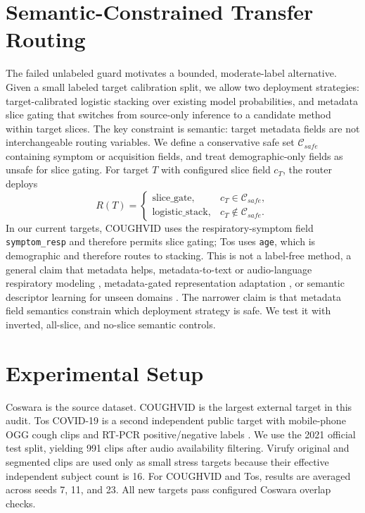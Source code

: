 \documentclass{article}
\begin{document}
\section{Semantic-Constrained Transfer Routing}
The failed unlabeled guard motivates a bounded, moderate-label alternative. Given a small labeled target calibration split, we allow two deployment strategies: target-calibrated logistic stacking over existing model probabilities, and metadata slice gating that switches from source-only inference to a candidate method within target slices. The key constraint is semantic: target metadata fields are not interchangeable routing variables. We define a conservative safe set $\mathcal{C}_{safe}$ containing symptom or acquisition fields, and treat demographic-only fields as unsafe for slice gating. For target $T$ with configured slice field $c_T$, the router deploys
\begin{equation}
R(T)=
\begin{cases}
\mathrm{slice\_gate}, & c_T \in \mathcal{C}_{safe},\\
\mathrm{logistic\_stack}, & c_T \notin \mathcal{C}_{safe}.
\end{cases}
\label{eq:semantic_router}
\end{equation}
In our current targets, COUGHVID uses the respiratory-symptom field \texttt{symptom\_resp} and therefore permits slice gating; Tos uses \texttt{age}, which is demographic and therefore routes to stacking. This is not a label-free method, a general claim that metadata helps, metadata-to-text or audio-language respiratory modeling \cite{kim2024bts,wang2026acula,siam2026respiramfm}, metadata-gated representation adaptation \cite{mehralian2026gloria}, or semantic descriptor learning for unseen domains \cite{yang2015unified,kumagai2018zeroshot}. The narrower claim is that metadata field semantics constrain which deployment strategy is safe. We test it with inverted, all-slice, and no-slice semantic controls.

\section{Experimental Setup}
Coswara is the source dataset. COUGHVID is the largest external target in this audit. Tos COVID-19 is a second independent public target with mobile-phone OGG cough clips and RT-PCR positive/negative labels \cite{buenosaires2021toscovid}. We use the 2021 official test split, yielding 991 clips after audio availability filtering. Virufy original and segmented clips are used only as small stress targets because their effective independent subject count is 16. For COUGHVID and Tos, results are averaged across seeds 7, 11, and 23. All new targets pass configured Coswara overlap checks.
\end{document}
